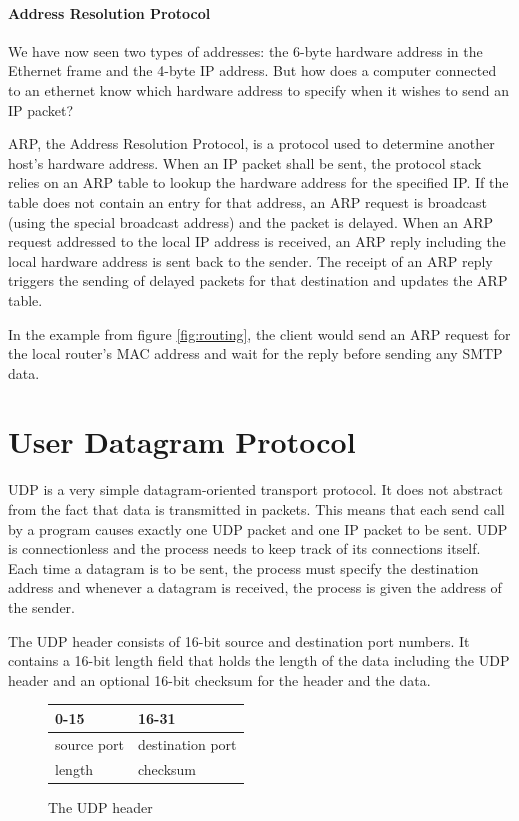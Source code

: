 \documentclass[11pt,twoside,abstract,notitlepage]{scrreprt}
\newcommand{\todo}[1]{
}
\begin{document}
\todo{more IP details?}


\paragraph{Address Resolution Protocol} We have now seen two types of addresses: the 6-byte hardware address in the Ethernet frame and the 4-byte IP address. But how does a computer connected to an ethernet know which hardware address to specify when it wishes to send an IP packet? 

ARP, the Address Resolution Protocol, is a protocol used to determine another host's hardware address. When an IP packet shall be sent, the protocol stack relies on an ARP table to lookup the hardware address for the specified IP. If the table does not contain an entry for that address, an ARP request is broadcast (using the special broadcast address) and the packet is delayed. When an ARP request addressed to the local IP address is received, an ARP reply including the local hardware address is sent back to the sender. The receipt of an ARP reply triggers the sending of delayed packets for that destination and updates the ARP table.

In the example from figure \ref{fig:routing}, the client would send an ARP request for the local router's MAC address and wait for the reply before sending any SMTP data. 




\section{User Datagram Protocol} 
UDP is a very simple datagram-oriented transport protocol. It does not abstract from the fact that data is transmitted in packets. This means that each send call by a program causes exactly one UDP packet and one IP packet to be sent. UDP is connectionless and the process needs to keep track of its connections itself. Each time a datagram is to be sent, the process must specify the destination address and whenever a datagram is received, the process is given the address of the sender.

The UDP header consists of 16-bit source and destination port numbers. It contains a 16-bit length field that holds the length of the data including the UDP header and an optional 16-bit checksum for the header and the data. 

\begin{figure}
\renewcommand{\arraystretch}{1.2}
\caption{The UDP header}
\label{udpheader}
\centering
\begin{tabularx}{\textwidth}{|X|X|}
\hline
0-15 & 16-31 \\ \hline
source port & destination port \\ \hline
length & checksum \\ \hline
\end{tabularx}
\end{figure}  
\end{document}
